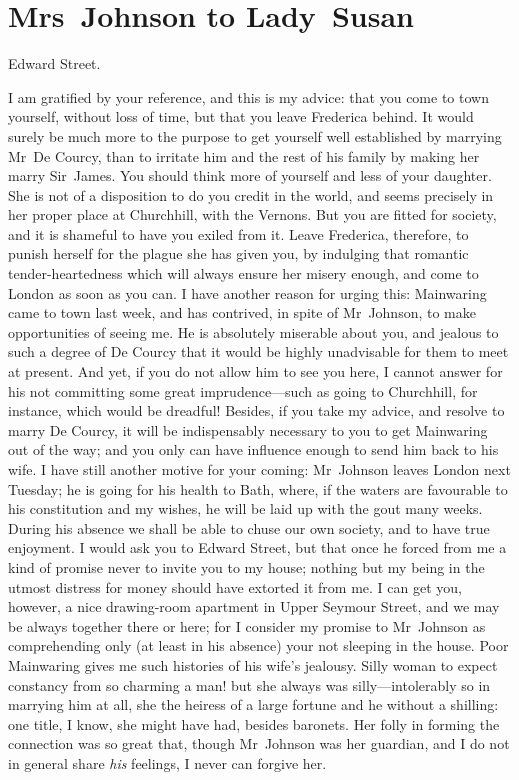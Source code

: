 \chapter{Mrs~Johnson to Lady~Susan}
  
  \begin{mail}{Edward Street.}{}

I am gratified by your reference, and this is my advice: that you come to town yourself, without loss of time, but that you leave Frederica behind. It would surely be much more to the purpose to get yourself well established by marrying Mr~De Courcy, than to irritate him and the rest of his family by making her marry Sir~James. You should think more of yourself and less of your daughter. She is not of a disposition to do you credit in the world, and seems precisely in her proper place at Churchhill, with the Vernons. But you are fitted for society, and it is shameful to have you exiled from it. Leave Frederica, therefore, to punish herself for the plague she has given you, by indulging that romantic tender-heartedness which will always ensure her misery enough, and come to London as soon as you can. I have another reason for urging this: Mainwaring came to town last week, and has contrived, in spite of Mr~Johnson, to make opportunities of seeing me. He is absolutely miserable about you, and jealous to such a degree of De Courcy that it would be highly unadvisable for them to meet at present. And yet, if you do not allow him to see you here, I cannot answer for his not committing some great imprudence—such as going to Churchhill, for instance, which would be dreadful! Besides, if you take my advice, and resolve to marry De Courcy, it will be indispensably necessary to you to get Mainwaring out of the way; and you only can have influence enough to send him back to his wife. I have still another motive for your coming: Mr~Johnson leaves London next Tuesday; he is going for his health to Bath, where, if the waters are favourable to his constitution and my wishes, he will be laid up with the gout many weeks. During his absence we shall be able to chuse our own society, and to have true enjoyment. I would ask you to Edward Street, but that once he forced from me a kind of promise never to invite you to my house; nothing but my being in the utmost distress for money should have extorted it from me. I can get you, however, a nice drawing-room apartment in Upper Seymour Street, and we may be always together there or here; for I consider my promise to Mr~Johnson as comprehending only (at least in his absence) your not sleeping in the house. Poor Mainwaring gives me such histories of his wife's jealousy. Silly woman to expect constancy from so charming a man! but she always was silly—intolerably so in marrying him at all, she the heiress of a large fortune and he without a shilling: one title, I know, she might have had, besides baronets. Her folly in forming the connection was so great that, though Mr~Johnson was her guardian, and I do not in general share \textit{his} feelings, I never can forgive her. 

\end{mail}